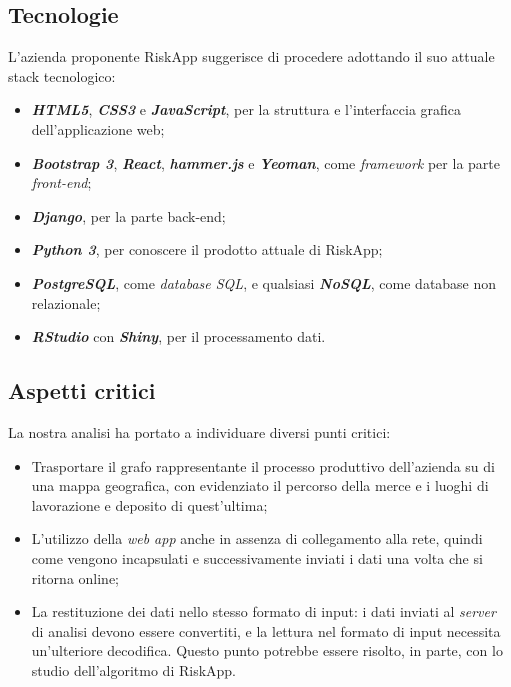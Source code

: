 \subsection{Tecnologie}
L'azienda proponente RiskApp suggerisce di procedere adottando il suo attuale stack tecnologico:
\begin{itemize}
	\item \textbf{\textit{HTML5}}, \textbf{\textit{CSS3}} e \textbf{\textit{JavaScript}}, per la struttura e l'interfaccia grafica dell'applicazione web;
	\item \textbf{\textit{Bootstrap 3}}, \textbf{\textit{React}}, \textbf{\textit{hammer.js}} e \textbf{\textit{Yeoman}}, come \textit{framework} per la parte \textit{front-end};
	\item \textbf{\textit{Django}}, per la parte back-end;
	\item \textbf{\textit{Python 3}}, per conoscere il prodotto attuale di RiskApp;
	\item \textbf{\textit{PostgreSQL}}, come \textit{database SQL}, e qualsiasi \textbf{\textit{NoSQL}}, come database non relazionale;
	\item \textbf{\textit{RStudio}} con \textbf{\textit{Shiny}}, per il processamento dati.
\end{itemize}

\subsection{Aspetti critici}

La nostra analisi ha portato a individuare diversi punti critici:
\begin{itemize}
	\item Trasportare il grafo rappresentante il processo produttivo dell’azienda su di una mappa geografica, con evidenziato il percorso della merce e i luoghi di lavorazione e deposito di quest'ultima;
	\item L'utilizzo della \textit{web app} anche in assenza di collegamento alla rete, quindi come vengono incapsulati e successivamente inviati i dati una volta che si ritorna online;
	\item La restituzione dei dati nello stesso formato di input: i dati inviati al \textit{server} di analisi devono essere convertiti, e la lettura nel formato di input necessita un'ulteriore decodifica. Questo punto potrebbe essere risolto, in parte, con lo studio dell’algoritmo di RiskApp.
\end{itemize}

